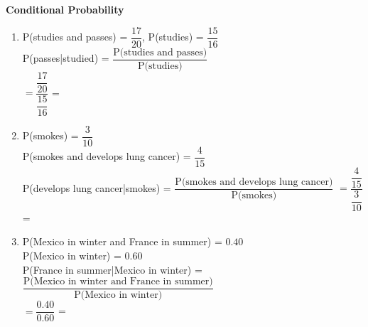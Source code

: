 \begin{center}
\textbf{Conditional Probability}\\
\end{center}

\vspace*{1ex}

\begin{enumerate}[label = \arabic*. ]
\item %
P(studies and  passes) = $\dfrac{17}{20} $, \redcheck %
\hspce P(studies) = $\dfrac{15}{16} $ \redcheck \\
P(passes|studied) = $\dfrac{\text{P(studies and  passes)}}{\text{P(studies)}} $ \redcheck \\
$ = \dfrac{\dfrac{17}{20}}{\dfrac{15}{16}} $ \redcheck %
= \redcheck 
 

\item %
P(smokes) = $\dfrac{3}{10} $  \redcheck \\
P(smokes and develops lung cancer) = $\dfrac{4}{15} $ \redcheck \\
P(develops lung cancer|smokes) = $\dfrac{\text{P(smokes and develops lung cancer)}}{\text{P(smokes)}} $ \redcheck %
$ = \dfrac{\dfrac{4}{15}}{\dfrac{3}{10}} $ \redcheck %
= \redcheck 
 

\item %
 P(Mexico in winter and France in summer) = $0.40$ \redcheck \\
P(Mexico in winter) = $0.60$ \redcheck \\
P(France in summer|Mexico in winter) = $\dfrac{\text{P(Mexico in winter and France in summer)}}{\text{P(Mexico in winter)}} $ \redcheck \\
$ = \dfrac{0.40}{0.60} $ \redcheck%
= \redcheck 
 


\end{enumerate}
